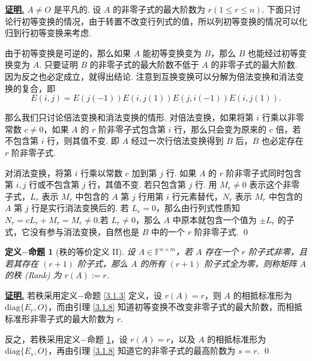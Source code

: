 \documentclass[10pt,openany]{article}
\theoremstyle{thmstyle} %
\theoremstyle{defstyle} %
\newtheorem{defprop}[theorem]{定义\(-\)命题}
\theoremstyle{prostyle} %
\theoremstyle{exastyle}
\theoremstyle{remstyle}
\renewenvironment{proof}[1][证明]{\par\underline{\textbf{#1.}} \;\fangsong}{\qed\par}
\newcommand{\F}{\mathbb{F}}
\newcommand{\nm}{^{n \times m}}
\newcommand{\diag}{\mathrm{diag}}
\begin{document}
\begin{proof}
	 \( A \neq O \) 是平凡的. 设 \( A \) 的非零子式的最大阶数为 \( r (1 \leq r \leq n) \). 下面只讨论行初等变换的情况，由于转置不改变行列式的值，所以列初等变换的情况可以化归到行初等变换来考虑. 
	 
	 由于初等变换是可逆的，那么如果 \( A \) 能初等变换变为 \( B \)，那么 \( B \) 也能经过初等变换变为 \( A \). 只要证明 \( B \) 的非零子式的最大阶数不低于 \( A \) 的非零子式的最大阶数. 因为反之也必定成立，就得出结论. 注意到互换变换可以分解为倍法变换和消法变换的复合，即
	 \[ E(i,j)=E(j(-1))E(i,j(1))E(j,i(-1))E(i,j(1)). \]
	 
	 那么我们只讨论倍法变换和消法变换的情形. 对倍法变换，如果将第 \( i \) 行乘以非零常数 \( c \neq 0 \)，如果 \( A \) 的 \( r \) 阶非零子式包含第 \( i \) 行，那么只会变为原来的 \( c \) 倍，若不包含第 \( i \) 行，则其值不变. 即 \( A \) 经过一次行倍法变换得到 \( B \) 后，\( B \) 也必定存在 \( r \) 阶非零子式.
	 
	 对消法变换，将第 \( i \) 行乘以常数 \( c \) 加到第 \( j \) 行. 如果 \( A \) 的 \( r \) 阶非零子式同时包含第 \( i,j \) 行或不包含第 \( j \) 行，其值不变. 若只包含第 \( j \) 行. 用 \( M_r \neq 0  \) 表示这个非零子式，\( L_r \) 表示 \( M_r \) 中包含的 \( A \) 第 \( j \) 行用第 \( i \) 行元素替代，\( N_r \) 表示 \( M_r \) 中包含的 \( A \) 第 \( j \) 行是实行消法变换后的. 若 \( L_r=0 \)，那么由行列式性质知 \( N_r=cL_r+M_r=M_r \neq 0 \).若 \( L_r \neq 0 \)，那么 \( A \) 中原本就包含一个值为 \( \pm L_r \) 的子式，它没有参与消法变换，自然也是 \( B \) 中的一个 \( r \) 阶非零子式.
\end{proof}

\begin{defprop}[秩的等价定义 II] \label{3.1.9}
	设 \( A \in \F\nm \)，若 \( A \) 存在一个 \( r \) 阶子式非零，且若其存在 \( (r+1) \) 阶子式，那么 \( A \) 的所有  \( (r+1) \) 阶子式全为零，则称矩阵 \( A \) 的秩 (Rank) 为 \( r(A):=r \).
\end{defprop}

\begin{proof}
	若秩采用定义\(-\)命题 \ref{3.1.3} 定义，设 \( r(A)=r \)，则 \( A \) 的相抵标准形为 \( \diag\{E_r,O\} \)，而由引理 \ref{3.1.8} 知道初等变换不改变非零子式的最大阶数，而相抵标准形非零子式的最大阶数为 \( r \). 
	
	反之，若秩采用定义\(-\)命题 \ref{3.1.9}，设 \( r(A)=r \)，以及 \( A \) 的相抵标准形为 \( \diag\{E_s,O\} \)，再由引理 \ref{3.1.8} 知道它的非零子式的最高阶数为 \( s=r \).
\end{proof}
\end{document}

